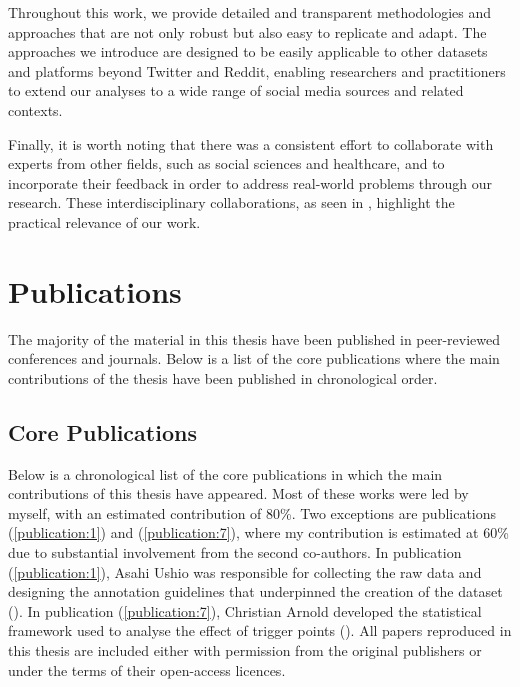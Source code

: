 Throughout this work, we provide detailed and transparent methodologies and approaches that are not only robust but also easy to replicate and adapt. The approaches we introduce are designed to be easily applicable to other datasets and platforms beyond Twitter and Reddit, enabling researchers and practitioners to extend our analyses to a wide range of social media sources and related contexts.

Finally, it is worth noting that there was a consistent effort to collaborate with experts from other fields, such as social sciences and healthcare, and to incorporate their feedback in order to address real-world problems through our research. These interdisciplinary collaborations,  as seen in , highlight the practical relevance of our work.


\section{Publications} \label{ch:intro:publications}
The majority of the material in this thesis have been published in peer-reviewed conferences and journals. Below is a list of the core publications where the main contributions of the thesis have been published in chronological order.


\subsection{Core Publications} 
Below is a chronological list of the core publications in which the main contributions of this thesis have appeared. Most of these works were led by myself, with an estimated contribution of 80\%. Two exceptions are publications (\ref{publication:1}) and (\ref{publication:7}), where my contribution is estimated at 60\% due to substantial involvement from the second co-authors. In publication (\ref{publication:1}), Asahi Ushio was responsible for collecting the raw data and designing the annotation guidelines that underpinned the creation of the {\TweetTopic} dataset (). In publication (\ref{publication:7}), Christian Arnold developed the statistical framework used to analyse the effect of trigger points (). All papers reproduced in this thesis are included either with permission from the original publishers or under the terms of their open-access licences.


